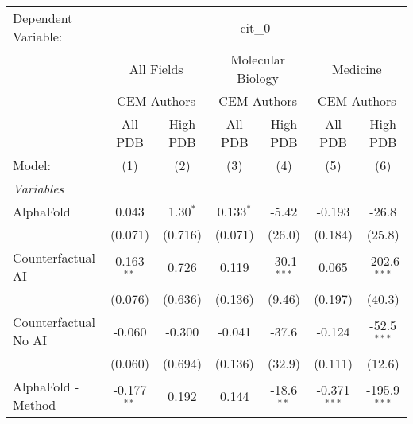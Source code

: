 \begingroup
\centering
\begin{tabular}{lcccccc}
   \tabularnewline \midrule \midrule
   Dependent Variable: & \multicolumn{6}{c}{cit\_0}\\
 & \multicolumn{2}{c}{All Fields} & \multicolumn{2}{c}{Molecular Biology} & \multicolumn{2}{c}{Medicine} \\
\cmidrule(lr){2-3} \cmidrule(lr){4-5} \cmidrule(lr){6-7}
 & \multicolumn{2}{c}{CEM Authors} & \multicolumn{2}{c}{CEM Authors} & \multicolumn{2}{c}{CEM Authors} \\
\cmidrule(lr){2-3} \cmidrule(lr){4-5} \cmidrule(lr){6-7}
 & \multicolumn{1}{c}{All PDB} & \multicolumn{1}{c}{High PDB} & \multicolumn{1}{c}{All PDB} & \multicolumn{1}{c}{High PDB} & \multicolumn{1}{c}{All PDB} & \multicolumn{1}{c}{High PDB} \\
\cmidrule(lr){2-2} \cmidrule(lr){3-3} \cmidrule(lr){4-4} \cmidrule(lr){5-5} \cmidrule(lr){6-6} \cmidrule(lr){7-7}
   Model:                                                     & (1)           & (2)          & (3)            & (4)           & (5)            & (6)\\  
   \midrule
   \emph{Variables}\\
   AlphaFold                                                  & 0.043         & 1.30$^{*}$   & 0.133$^{*}$    & -5.42         & -0.193         & -26.8\\   
                                                              & (0.071)       & (0.716)      & (0.071)        & (26.0)        & (0.184)        & (25.8)\\   
   Counterfactual AI                                          & 0.163$^{**}$  & 0.726        & 0.119          & -30.1$^{***}$ & 0.065          & -202.6$^{***}$\\   
                                                              & (0.076)       & (0.636)      & (0.136)        & (9.46)        & (0.197)        & (40.3)\\   
   Counterfactual No AI                                       & -0.060        & -0.300       & -0.041         & -37.6         & -0.124         & -52.5$^{***}$\\   
                                                              & (0.060)       & (0.694)      & (0.136)        & (32.9)        & (0.111)        & (12.6)\\   
   AlphaFold - Method                                         & -0.177$^{**}$ & 0.192        & 0.144          & -18.6$^{**}$  & -0.371$^{***}$ & -195.9$^{***}$\\   

\end{tabular}
